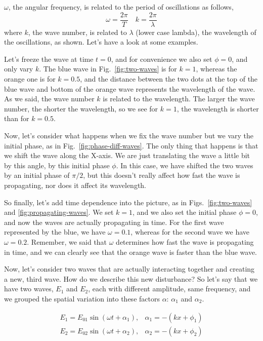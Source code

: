 $\omega$, the angular frequency, is related to the period of oscillations as follows,
\begin{equation}
\omega=\frac{2 \pi}{T} \quad k=\frac{2 \pi}{\lambda}
\end{equation}
where $k$, the wave number, is related to $\lambda$ (lower case lambda), the wavelength of the oscillations, as shown. Let's have a look at some examples.

Let's freeze the wave at time $t=0$, and for convenience we also set $\phi = 0$, and only vary $k$. The blue wave in Fig.~\ref{fig:two-waves} is for $k=1$, whereas the orange one is for $k=0.5$, and the distance between the two dots at the top of the blue wave and bottom of the orange wave represents the wavelength of the wave. As we said, the wave number $k$ is related to the wavelength. The larger the wave number, the shorter the wavelength, so we see for $k=1$, the wavelength is shorter than for $k=0.5$.

Now, let's consider what happens when we fix the wave number but we vary the initial phase, as in Fig.~\ref{fig:phase-diff-waves}. The only thing that happens is that we shift the wave along the X-axis. We are just translating the wave a little bit by this angle, by this initial phase $\phi$. In this case, we have shifted the two waves by an initial phase of $\pi/2$, but this doesn't really affect how fast the wave is propagating, nor does it affect its wavelength.

So finally, let's add time dependence into the picture, as in Figs.~\ref{fig:two-waves} and \ref{fig:propagating-waves}. We set $k=1$, and we also set the initial phase $\phi=0$, and now the waves are actually propagating in time. For the first wave represented by the blue, we have $\omega=0.1$, whereas for the second wave we have $\omega=0.2$. Remember, we said that $\omega$ determines how fast the wave is propagating in time, and we can clearly see that the orange wave is faster than the blue wave.

Now, let's consider two waves that are actually interacting together and creating a new, third wave. How do we describe this new disturbance? So let's say that we have two waves, $E_1$ and $E_2$, each with different amplitude, same frequency, and we grouped the spatial variation into these factors $\alpha$: $\alpha_1$ and $\alpha_2$.

\begin{equation}
\begin{array}{ll}
E_1=E_{01} \sin \left(\omega t+\alpha_1\right), & \alpha_1=-\left(k x+\phi_1\right) \\
E_2=E_{02} \sin \left(\omega t+\alpha_2\right), & \alpha_2=-\left(k x+\phi_2\right)
\end{array}
\label{eq:superposition}
\end{equation}


